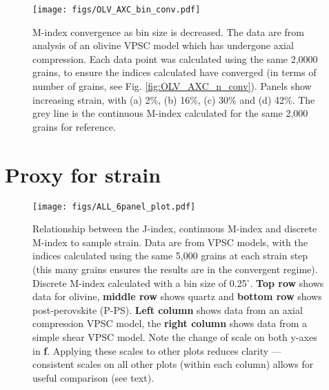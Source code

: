 \documentclass[a4paper,12pt]{report}
\numberwithin{equation}{chapter}
\begin{document}
\begin{figure}[h!]
  \centering
    \texttt{[image: figs/OLV\_AXC\_bin\_conv.pdf]}
  \caption[Convergence with bin size (olivine)]{M-index convergence as bin size is decreased. The data are from analysis of an olivine VPSC model which has undergone axial compression. Each data point was calculated using the same 2,0000 grains, to ensure the indices calculated have converged (in terms of number of grains, see Fig. \ref{fig:OLV_AXC_n_conv}). Panels show increasing strain, with (a) 2\%, (b) 16\%, (c) 30\% and (d) 42\%. The grey line is the continuous M-index calculated for the same 2,000 grains for reference.}
  \label{fig:OLV_AXC_b_conv}
\end{figure}  


\section{Proxy for strain}

\begin{figure*}[p]
  \centering
    \texttt{[image: figs/ALL\_6panel\_plot.pdf]}
  \caption[Relation of indices to strain]{Relationship between the J-index, continuous M-index and discrete M-index to sample strain. Data are from VPSC models, with the indices calculated using the same 5,000 grains at each strain step (this many grains ensures the results are in the convergent regime). Discrete M-index calculated with a bin size of 0.25$^\circ$. \textbf{Top row} shows data for olivine, \textbf{middle row} shows quartz and \textbf{bottom row} shows post-perovskite (P-PS). \textbf{Left column} shows data from an axial compression VPSC model, the \textbf{right column} shows data from a simple shear VPSC model. Note the change of scale on both y-axes in \textbf{f}. Applying these scales to other plots reduces clarity --- consistent scales on all other plots (within each column) allows for useful comparison (see text).}
  \label{fig:indices_vs_strain}
\end{figure*} 
\end{document}
